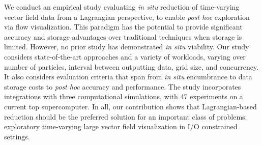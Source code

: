 We conduct an empirical study evaluating 
\textit{in situ} reduction of time-varying vector field data
from a Lagrangian perspective,
to enable \textit{post hoc} exploration via flow visualization.
%
This paradigm has the potential to provide significant accuracy and storage
advantages over traditional techniques when storage is limited.
%
However, no prior study has demonstrated 
\textit{in situ} viability.
%
Our study considers state-of-the-art approaches and a variety
of workloads, varying over number of particles, interval between
outputting data, grid size, and concurrency.
%
It also considers evaluation criteria that span from \textit{in situ}
encumbrance to data storage costs to \textit{post hoc} accuracy
and performance.
%
The study incorporates integrations with three computational simulations,
with 47 experiments on a current top supercomputer.
%
In all, our contribution shows that Lagrangian-based reduction
should be the preferred solution for an important
class of problems: exploratory time-varying large vector field visualization in I/O constrained settings. 
